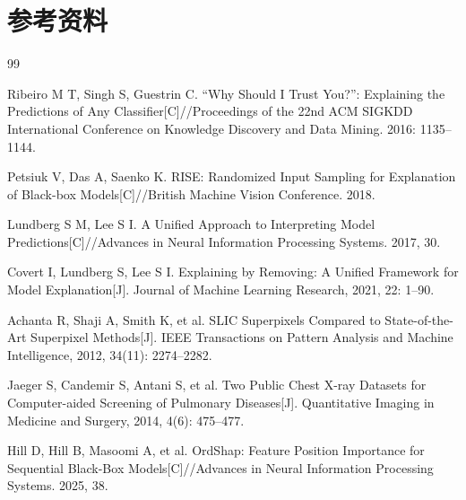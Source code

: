 
\clearpage
{}
\chapter*{参考资料}

\begin{thebibliography}{99}

Ribeiro M T, Singh S, Guestrin C. ``Why Should I Trust You?'': Explaining the Predictions of Any Classifier[C]//Proceedings of the 22nd ACM SIGKDD International Conference on Knowledge Discovery and Data Mining. 2016: 1135--1144.

Petsiuk V, Das A, Saenko K. RISE: Randomized Input Sampling for Explanation of Black-box Models[C]//British Machine Vision Conference. 2018.

Lundberg S M, Lee S I. A Unified Approach to Interpreting Model Predictions[C]//Advances in Neural Information Processing Systems. 2017, 30.

Covert I, Lundberg S, Lee S I. Explaining by Removing: A Unified Framework for Model Explanation[J]. Journal of Machine Learning Research, 2021, 22: 1--90.

Achanta R, Shaji A, Smith K, et al. SLIC Superpixels Compared to State-of-the-Art Superpixel Methods[J]. IEEE Transactions on Pattern Analysis and Machine Intelligence, 2012, 34(11): 2274--2282.

Jaeger S, Candemir S, Antani S, et al. Two Public Chest X-ray Datasets for Computer-aided Screening of Pulmonary Diseases[J]. Quantitative Imaging in Medicine and Surgery, 2014, 4(6): 475--477.

Hill D, Hill B, Masoomi A, et al. OrdShap: Feature Position Importance for Sequential Black-Box Models[C]//Advances in Neural Information Processing Systems. 2025, 38.

\end{thebibliography}
